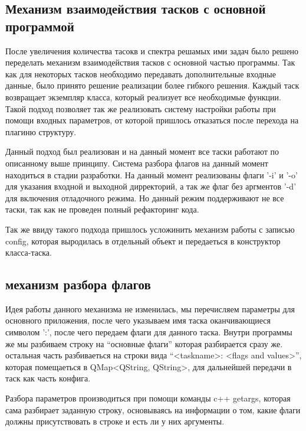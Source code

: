 
\subsection{Механизм взаимодействия тасков с основной программой}

После увеличения количества тасокв и спектра решамых ими задач было решено переделать механизм взаимодействия тасков с основной частью программы. Так как для некоторых тасков необходимо передавать дополнительные входные данные, было принято решение реализации более гибкого решения. Каждый таск возвращает экземпляр класса, который реализует все необходимые функции. Такой подход позволяет так же реализовать систему настройки работы при помощи входных параметров, от которой пришлось отказаться после перехода на плагиню структуру.

Данный подход был реализован и на данный момент все таски работают по описанному выше принципу. Система разбора флагов на данный момент находиться в стадии разработки. На данный момент реализованы флаги '-i' и '-o' для указания входной и выходной дирректорий, а так же флаг без аргментов '-d' для включения отладочного режима. Но данный режим поддерживают не все таски, так как не проведен полный рефакторинг кода.

Так же ввиду такого подхода пришлось усложинить механизм работы с записью config, которая выродилась в отдельный объект и передаеться в конструктор класса-таска.

\subsection{механизм разбора флагов}

Идея работы данного механизма не изменилась, мы перечисляем параметры для основного приложения, после чего указываем имя таска оканчивающиеся символом ':', после чего передаем флаги для данного таска. Внутри программы же мы разбиваем строку на ``основные флаги'' которая разбирается сразу же. остальная часть разбиваеться на строки вида ``<taskname>: <flags and values>'', которая помещаеться в QMap<QString, QString>, для дальнейшей передачи в таск как часть конфига.

Разбора параметров производиться при помощи команды c++ getargs, которая сама разбирает заданную строку, основываясь на информации о том, какие флаги должны присутствовать в строке и есть ли у них аргументы.

